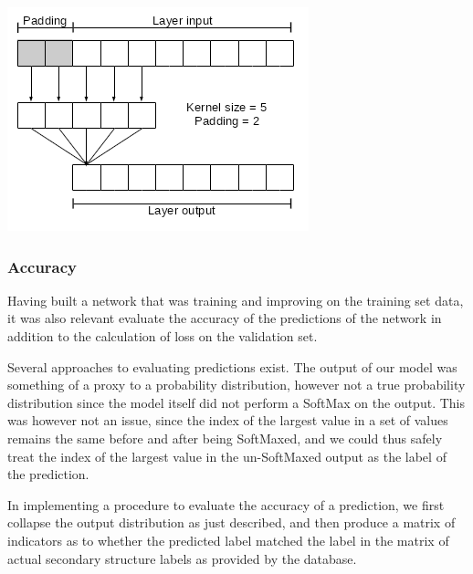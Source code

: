 \begin{multicols}{2}
\begin{Figure}
 \centering
 \includegraphics[width=\linewidth]{../graphs/padding}
 \captionsetup{width=0.8\linewidth, font=small}
\end{Figure}

\subsubsection{Accuracy}
Having built a network that was training and improving on the training set data, it was also relevant evaluate the accuracy of the predictions of the network in addition to the calculation of loss on the validation set.

Several approaches to evaluating predictions exist. The output of our model was something of a proxy to a probability distribution, however not a true probability distribution since the model itself did not perform a SoftMax on the output. This was however not an issue, since the index of the largest value in a set of values remains the same before and after being SoftMaxed, and we could thus safely treat the index of the largest value in the un-SoftMaxed output as the label of the prediction.

In implementing a procedure to evaluate the accuracy of a prediction, we first collapse the output distribution as just described, and then produce a matrix of indicators as to whether the predicted label matched the label in the matrix of actual secondary structure labels as provided by the database.


\end{multicols}
